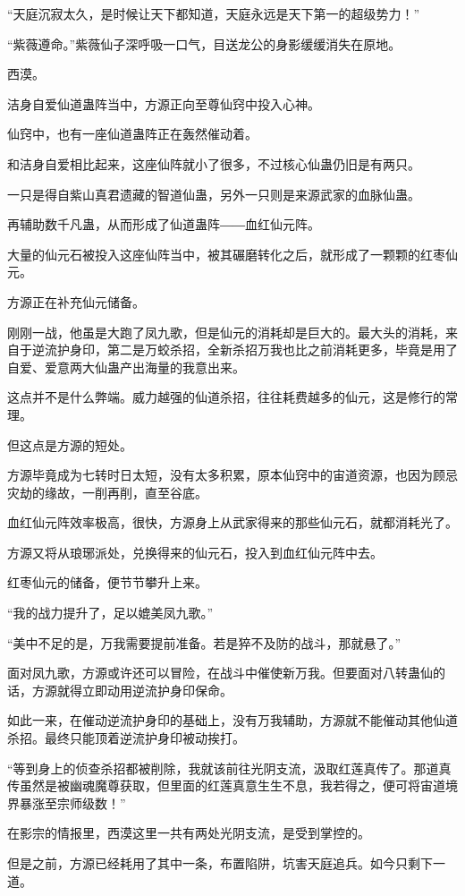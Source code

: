 \begin{this_body}
“天庭沉寂太久，是时候让天下都知道，天庭永远是天下第一的超级势力！”

“紫薇遵命。”紫薇仙子深呼吸一口气，目送龙公的身影缓缓消失在原地。

西漠。

洁身自爱仙道蛊阵当中，方源正向至尊仙窍中投入心神。

仙窍中，也有一座仙道蛊阵正在轰然催动着。

和洁身自爱相比起来，这座仙阵就小了很多，不过核心仙蛊仍旧是有两只。

一只是得自紫山真君遗藏的智道仙蛊，另外一只则是来源武家的血脉仙蛊。

再辅助数千凡蛊，从而形成了仙道蛊阵――血红仙元阵。

大量的仙元石被投入这座仙阵当中，被其碾磨转化之后，就形成了一颗颗的红枣仙元。

方源正在补充仙元储备。

刚刚一战，他虽是大跑了凤九歌，但是仙元的消耗却是巨大的。最大头的消耗，来自于逆流护身印，第二是万蛟杀招，全新杀招万我也比之前消耗更多，毕竟是用了自爱、爱意两大仙蛊产出海量的我意出来。

这点并不是什么弊端。威力越强的仙道杀招，往往耗费越多的仙元，这是修行的常理。

但这点是方源的短处。

方源毕竟成为七转时日太短，没有太多积累，原本仙窍中的宙道资源，也因为顾忌灾劫的缘故，一削再削，直至谷底。

血红仙元阵效率极高，很快，方源身上从武家得来的那些仙元石，就都消耗光了。

方源又将从琅琊派处，兑换得来的仙元石，投入到血红仙元阵中去。

红枣仙元的储备，便节节攀升上来。

“我的战力提升了，足以媲美凤九歌。”

“美中不足的是，万我需要提前准备。若是猝不及防的战斗，那就悬了。”

面对凤九歌，方源或许还可以冒险，在战斗中催使新万我。但要面对八转蛊仙的话，方源就得立即动用逆流护身印保命。

如此一来，在催动逆流护身印的基础上，没有万我辅助，方源就不能催动其他仙道杀招。最终只能顶着逆流护身印被动挨打。

“等到身上的侦查杀招都被削除，我就该前往光阴支流，汲取红莲真传了。那道真传虽然是被幽魂魔尊获取，但里面的红莲真意生生不息，我若得之，便可将宙道境界暴涨至宗师级数！”

在影宗的情报里，西漠这里一共有两处光阴支流，是受到掌控的。

但是之前，方源已经耗用了其中一条，布置陷阱，坑害天庭追兵。如今只剩下一道。


\end{this_body}
